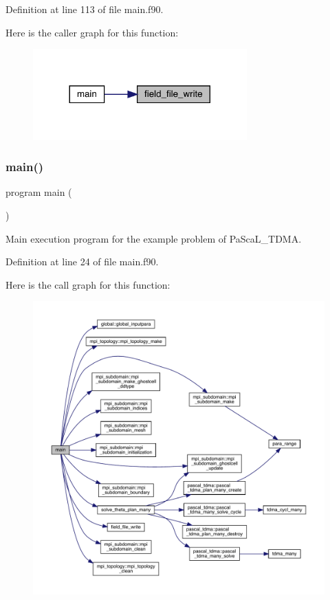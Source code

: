Definition at line 113 of file main.\+f90.

Here is the caller graph for this function\+:
\nopagebreak
\begin{figure}[H]
\begin{center}
\leavevmode
\includegraphics[width=233pt]{main_8f90_af0a1310807f21ee1a2c0fdf14c58b63b_icgraph}
\end{center}
\end{figure}
\mbox{\label{main_8f90_a8ec2266d83cd6c0b762cbcbc92c0af3d}} 
\subsubsection{\texorpdfstring{main()}{main()}}
{\footnotesize\ttfamily program main (\begin{DoxyParamCaption}{ }\end{DoxyParamCaption})}



Main execution program for the example problem of Pa\+Sca\+L\+\_\+\+T\+D\+MA. 



Definition at line 24 of file main.\+f90.

Here is the call graph for this function\+:
\nopagebreak
\begin{figure}[H]
\begin{center}
\leavevmode
\includegraphics[width=350pt]{main_8f90_a8ec2266d83cd6c0b762cbcbc92c0af3d_cgraph}
\end{center}
\end{figure}
